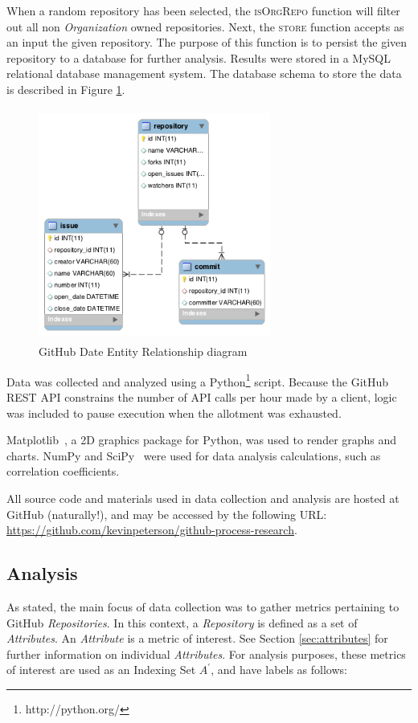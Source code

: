 \documentclass{proc}
\begin{document}
When a random repository has been selected, the \textsc{isOrgRepo} function will filter out all non \textit{Organization} owned repositories. Next, the \textsc{store} function accepts as an input the given repository. The purpose of this function is to persist the given repository to a database for further analysis. Results were stored in a MySQL relational database management system. The database schema to store the data is described in Figure \ref{fig:er_diagram}.

\begin{figure}
\includegraphics[height=3in,width=3in]{images/er.png}
\caption{GitHub Date Entity Relationship diagram}
\label{fig:er_diagram}
\end{figure}

Data was collected and analyzed using a Python\footnote{http://python.org/} script. Because the GitHub REST API constrains the number of API calls per hour made by a client, logic was included to pause execution when the allotment was exhausted.

Matplotlib~\cite{Hunter2007}, a 2D graphics package for Python, was used to render graphs and charts. NumPy and SciPy~\cite{scipy} were used for data analysis calculations, such as correlation coefficients.

All source code and materials used in data collection and analysis are hosted at GitHub (naturally!), and may be accessed by the following URL: \url{https://github.com/kevinpeterson/github-process-research}.

\subsection{Analysis}
As stated, the main focus of data collection was to gather metrics pertaining to GitHub \textit{Repositories}. In this context, a \textit{Repository} is defined as a set of \textit{Attributes}. An \textit{Attribute} is a metric of interest. See Section \ref{sec:attributes} for further information on individual \textit{Attributes}. For analysis purposes, these metrics of interest are used as an Indexing Set $A^\prime$, and have labels as follows:
\end{document}
